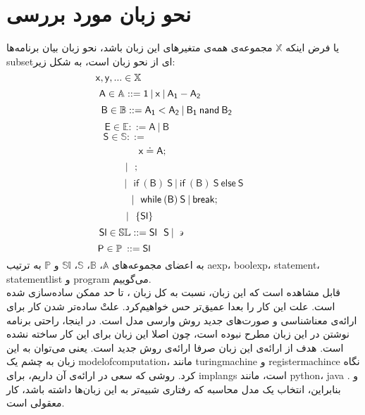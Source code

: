 \section{نحو زبان مورد بررسی‬}
یا فرض اینکه $\mathbb{X}$ مجموعه‌ی همه‌ی متغیرهای این زبان باشد، نحو زبان بیان برنامه‌ها \gls*{subset}ای از نحو زبان  است، به شکل زیر:
$$\mathsf{x,y},... \in \mathbb{X}\hspace{4.65cm}$$
$$\mathsf{A} \in \mathbb{A} ::=\mathsf{1\:|\:x\:|\:A_1 - A_2\hspace{2.4cm}}$$  
$$\mathsf{B \in \mathbb{B} ::=A_1<A_2 \:|\: B_1 \: nand\: B_2\hspace{1.2cm}}$$
$$\mathsf{E \in \mathbb{E}::= A \: | \: B\hspace{4cm}}$$
$$\mathsf{S\in \mathbb{S} ::=\hspace{5cm}  }$$
$$\mathsf{x\doteq A; \hspace{2.25cm}}$$
$$\mathsf{|\:\:\:;\hspace{3.75cm}}$$
$$\mathsf{|\:\:\:if\:(B)\:S\:|\:if\:(B)\:S\:else\:S}$$
$$\mathsf{|\:\:\:while\:(B)\:S\: | \: break;\hspace{0.65cm}}$$
$$\mathsf{|\:\:\:\{Sl\}\hspace{3.15cm}}$$
$$\mathsf{Sl \in \mathbb{SL}::=Sl\:\:\:S\:|\:\backepsilon}\hspace{3.05cm}$$
$$\mathsf{P\in \mathbb{P}\:::=Sl}\hspace{4.25cm}$$
به اعضای مجموعه‌ها‌ی
 $\mathbb{A}$،
 $\mathbb{B}$،
 $\mathbb{S}$،
 $\mathbb{Sl}$
 و
 $\mathbb{P}$
 به ترتیب
 \gls{aexp}، 
 \gls{boolexp}،
 \gls{statement}،
 \gls{statementlist} و
 \gls{program}
 می‌گوییم.\\

قابل مشاهده است که این زبان، نسبت به کل زبان ، تا حد ممکن ساده‌سازی شده است. علت این کار را بعدا عمیق‌تر حس خواهیم‌کرد. علتْ ساده‌تر شدن کار برای ارائه‌ی معناشناسی و صورت‌های جدید روش وارسی مدل است. در اینجا، راحتی برنامه نوشتن در این زبان مطرح نبوده است، چون اصلا این زبان برای این کار ساخته نشده است. هدف از ارائه‌ی این زبان صرفا ارائه‌ی روش جدید است. یعنی می‌توان به این زبان به چشم یک \gls*{modelofcomputation}، مانند \gls{turingmachine} و \gls{registermachince} نگاه کرد. روشی که سعی در ارائه‌‌ی آن داریم، برای \glspl*{implang} است، مانند \gls{python}، \gls{java} و . بنابراین، انتخاب یک مدل محاسبه که رفتاری شبیه‌تر به این زبان‌ها داشته باشد، کار معقولی است.

